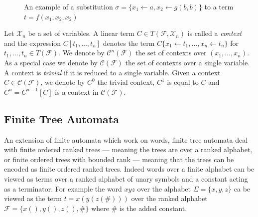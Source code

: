 \begin{figure}[H]
    \centering
    \caption{An example of a substitution $\sigma = \{x_1 \leftarrow a, x_2 \leftarrow g(b,b)\}$ to a term $t = f(x_1, x_2, x_2)$}
    \label{fig_tree_sub}
\end{figure}

\begin{defn}
Let $\mathcal{X}_n$ be a set of variables. A linear term $C \in T(\mathcal{F}, \mathcal{X}_n)$ is called a \emph{context} and the expression $C[t_1,\dots,t_n]$ denotes the term $C\{x_1 \leftarrow t_1, \dots, x_n \leftarrow t_n\}$ for $t_1, \dots, t_n \in T(\mathcal{F})$. We denote by $\mathcal{C}^n(\mathcal{F})$ the set of contexts over $(x_1, \dots, x_n)$. As a special case we denote by $\mathcal{C}(\mathcal{F})$ the set of contexts over a single variable. A context is \emph{trivial} if it is reduced to a single variable. Given a context $C \in \mathcal{C}(\mathcal{F})$, we denote by $C^0$ the trivial context, $C^1$ is equal to $C$ and $C^n = C^{n-1}[C]$ is a context in $\mathcal{C}(\mathcal{F})$.
\end{defn}

\subsection{Finite Tree Automata}
An extension of finite automata which work on words, finite tree automata deal with finite ordered ranked trees --- meaning the trees are over a ranked alphabet, or finite ordered trees with bounded rank --- meaning that the trees can be encoded as finite ordered ranked trees. Indeed words over a finite alphabet can be viewed as terms over a ranked alphabet of unary symbols and a constant acting as a terminator. For example the word $xyz$ over the alphabet $\Sigma = \{x,y,z\}$ ca be viewed as the term $t = x(y(z(\#)))$ over the ranked alphabet $\mathcal{F} = \{x(), y(), z(), \#\}$ where $\#$ is the added constant.

